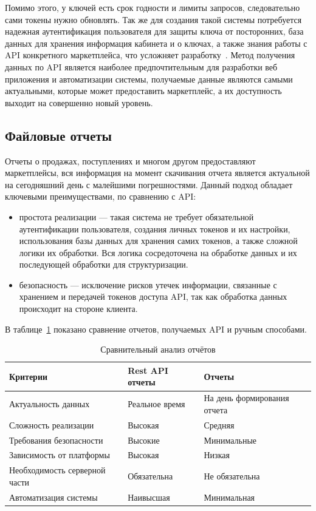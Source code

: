 Помимо этого, у ключей есть срок годности и лимиты запросов, следовательно сами токены нужно обновлять. Так же для создания такой системы потребуется надежная аутентификация пользователя для защиты ключа от посторонних, база данных для хранения информация кабинета и о ключах, а также знания работы с API конкретного маркетплейса, что усложняет разработку~\cite{usingAPI}. Метод получения данных по API является наиболее предпочтительным для разработки веб приложения и автоматизации системы, получаемые данные являются самыми актуальными, которые может предоставить маркетплейс, а их доступность выходит на совершенно новый уровень.

\subsection{Файловые отчеты}
Отчеты о продажах, поступлениях и многом другом предоставляют маркетплейсы, вся информация на момент скачивания отчета является актуальной на сегодняшний день с малейшими погрешностями. Данный подход обладает ключевыми преимуществами, по сравнению с API:

\begin{itemize}
    \item простота реализации --- такая система не требует обязательной аутентификации пользователя, создания личных токенов и их настройки, использования базы данных для хранения самих токенов, а также сложной логики их обработки. Вся логика сосредоточена на обработке данных и их последующей обработки для структуризации.
    \item безопасность --- исключение рисков утечек информации, связанные с хранением и передачей токенов доступа API, так как обработка данных происходит на стороне клиента.
\end{itemize}

В таблице~\ref{tab:comparison} показано сравнение отчетов, получаемых API и ручным способами.

\begin{table}[H]
\caption{\label{tab:comparison}Сравнительный анализ отчётов}
\begin{center}
\vspace{-0.5cm}\begin{tabular}{|p{6cm}|p{3.5cm}|p{5.5cm}|}
\hline
Критерии & Rest API отчеты & Отчеты \\ \hline
Актуальность данных & Реальное время & На день формирования отчета \\ \hline
Сложность реализации & Высокая & Средняя \\ \hline
Требования безопасности & Высокие & Минимальные \\ \hline
Зависимость от платформы & Высокая & Низкая \\ \hline
Необходимость серверной части & Обязательна & Не обязательна \\ \hline
Автоматизация системы & Наивысшая & Минимальная \\ \hline
\end{tabular}
\end{center}
\end{table}

